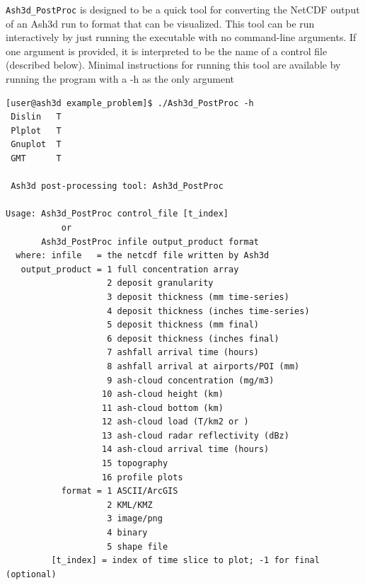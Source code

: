 \texttt{Ash3d\_PostProc} is designed to be a quick tool for converting the
NetCDF output of an Ash3d run to format that can be visualized. This tool
can be run interactively by just running the executable with no command-line
arguments. If one argument is provided, it is interpreted to be the name of a
control file (described below). Minimal instructions for running this tool
are available by running the program with a -h as the only argument
\small
\begin{verbatim}
[user@ash3d example_problem]$ ./Ash3d_PostProc -h
 Dislin   T
 Plplot   T
 Gnuplot  T
 GMT      T
                                                                                
 Ash3d post-processing tool: Ash3d_PostProc                                     
                                                                                
Usage: Ash3d_PostProc control_file [t_index]                                    
           or                                                                   
       Ash3d_PostProc infile output_product format                              
  where: infile   = the netcdf file written by Ash3d                            
   output_product = 1 full concentration array                                  
                    2 deposit granularity                                       
                    3 deposit thickness (mm time-series)                        
                    4 deposit thickness (inches time-series)                    
                    5 deposit thickness (mm final)                              
                    6 deposit thickness (inches final)                          
                    7 ashfall arrival time (hours)                              
                    8 ashfall arrival at airports/POI (mm)                      
                    9 ash-cloud concentration (mg/m3)                           
                   10 ash-cloud height (km)                                     
                   11 ash-cloud bottom (km)                                     
                   12 ash-cloud load (T/km2 or )                                
                   13 ash-cloud radar reflectivity (dBz)                        
                   14 ash-cloud arrival time (hours)                            
                   15 topography                                                
                   16 profile plots                                             
           format = 1 ASCII/ArcGIS                                              
                    2 KML/KMZ                                                   
                    3 image/png                                                 
                    4 binary                                                    
                    5 shape file                                                
         [t_index] = index of time slice to plot; -1 for final (optional)
\end{verbatim}
